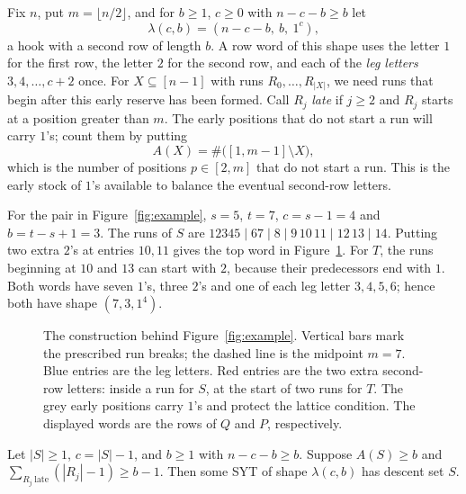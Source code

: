 \documentclass[12pt]{article}
\numberwithin{theorem}{section}
\numberwithin{equation}{section}
\begin{document}
Fix $n$, put $m=\lfloor n/2\rfloor$, and for $b\ge1$, $c\ge0$ with $n-c-b\ge b$ let
\[
\lambda(c,b)=(n-c-b,\ b,\ 1^c),
\]
a hook with a second row of length $b$. A row word of this shape uses the letter $1$ for the first row, the
letter $2$ for the second row, and each of the \emph{leg letters} $3,4,\dots,c+2$ once. For $X\subseteq[n-1]$
with runs $R_0,\dots,R_{|X|}$, we need runs that begin after this early reserve has been formed. Call $R_j$ \emph{late} if $j\ge2$ and $R_j$ starts at a position greater than
$m$. The early positions that do not start a run will carry $1$'s; count them by putting
\[
A(X)=\#\bigl([1,m-1]\setminus X\bigr),
\]
which is the number of positions $p\in[2,m]$ that do not start a run. This is the early stock of $1$'s available to balance the eventual second-row letters.

For the pair in Figure~\ref{fig:example}, $s=5$, $t=7$, $c=s-1=4$ and $b=t-s+1=3$.
The runs of $S$ are $12345\mid67\mid8\mid9\,10\,11\mid12\,13\mid14$.
Putting two extra $2$'s at entries $10,11$ gives the top word in Figure~\ref{fig:words}.
For $T$, the runs beginning at $10$ and $13$ can start with $2$, because their predecessors end with $1$.
Both words have seven $1$'s, three $2$'s and one of each leg letter $3,4,5,6$; hence both have shape $(7,3,1^4)$.
\begin{figure}[ht]
\centering
\caption{The construction behind Figure~\ref{fig:example}. Vertical bars mark the prescribed run breaks;
the dashed line is the midpoint $m=7$. Blue entries are the leg letters. Red entries are the two extra
second-row letters: inside a run for $S$, at the start of two runs for $T$. The grey early positions carry
$1$'s and protect the lattice condition. The displayed words are the rows of $Q$ and $P$, respectively.}
\label{fig:words}
\end{figure}


\begin{lemma}\label{lem:extra}
Let $|S|\ge1$, $c=|S|-1$, and $b\ge1$ with $n-c-b\ge b$. Suppose $A(S)\ge b$ and
$\sum_{R_j\ \mathrm{late}}(|R_j|-1)\ge b-1$. Then some SYT of shape $\lambda(c,b)$ has descent set $S$.
\end{lemma}
\end{document}
